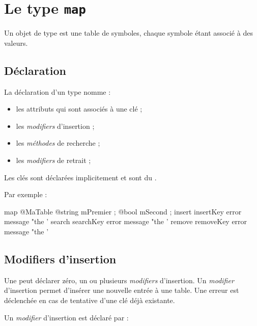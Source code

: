 
\chapter{Le type \texttt{map}}

Un objet de type  est une table de symboles, chaque symbole étant associé à des valeurs.

\section{Déclaration}

La déclaration d'un type  nomme :
\begin{itemize}
  \item les attributs qui sont associés à une clé ;
  \item les \emph{modifiers} d'insertion ;
  \item les \emph{méthodes} de recherche ;
  \item les \emph{modifiers} de retrait ;
\end{itemize}

Les clés sont déclarées implicitement et sont du .

Par exemple :

\begin{galgascode}
map @MaTable {
  @string mPremier ;
  @bool mSecond ;
  insert insertKey error message "the '%
  search searchKey error message "the '%
  remove removeKey error message "the '%
}
\end{galgascode}






\section{Modifiers d'insertion}

Une  peut déclarer zéro, un ou plusieurs \emph{modifiers} d'insertion. Un \emph{modifier} d'insertion permet d'insérer une nouvelle entrée à une table. Une erreur est déclenchée en cas de tentative d'une clé déjà existante.


Un \emph{modifier} d'insertion est déclaré par :

